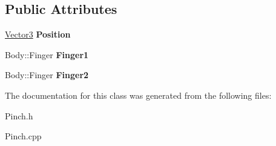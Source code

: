\subsection*{Public Attributes}
\begin{DoxyCompactItemize}
\item 
\hyperlink{class_efficio_1_1_vector3}{Vector3} {\bfseries Position}\hypertarget{class_efficio_1_1_input_recognition_1_1_human_1_1_hands_1_1_pinch_aef25b5e89e91b9e9a7886a087c1b019f}{}\label{class_efficio_1_1_input_recognition_1_1_human_1_1_hands_1_1_pinch_aef25b5e89e91b9e9a7886a087c1b019f}

\item 
Body\+::\+Finger {\bfseries Finger1}\hypertarget{class_efficio_1_1_input_recognition_1_1_human_1_1_hands_1_1_pinch_ad8c959f5692cdf6e62381296c9d895fc}{}\label{class_efficio_1_1_input_recognition_1_1_human_1_1_hands_1_1_pinch_ad8c959f5692cdf6e62381296c9d895fc}

\item 
Body\+::\+Finger {\bfseries Finger2}\hypertarget{class_efficio_1_1_input_recognition_1_1_human_1_1_hands_1_1_pinch_a54b57c5b8ac5818d94a37fe52a5c2633}{}\label{class_efficio_1_1_input_recognition_1_1_human_1_1_hands_1_1_pinch_a54b57c5b8ac5818d94a37fe52a5c2633}

\end{DoxyCompactItemize}


The documentation for this class was generated from the following files\+:\begin{DoxyCompactItemize}
\item 
Pinch.\+h\item 
Pinch.\+cpp\end{DoxyCompactItemize}
